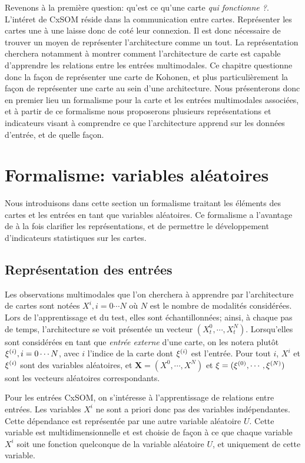Revenons à la première question: qu'est ce qu'une carte \emph{qui fonctionne ?}. L'intéret de CxSOM réside dans la communication entre cartes. Représenter les cartes une à une laisse donc de coté leur connexion. Il est donc nécessaire de trouver un moyen de représenter l'architecture comme un tout. La représentation cherchera notamment à montrer comment l'architecture de carte est capable d'apprendre les relations entre les entrées multimodales.
Ce chapitre questionne donc la façon de représenter une carte de Kohonen, et plus particulièrement la façon de représenter une carte au sein d'une architecture. Nous présenterons donc en premier lieu un formalisme pour la carte et les entrées multimodales associées, et à partir de ce formalisme nous proposerons plusieurs représentations et indicateurs visant à comprendre ce que l'architecture apprend sur les données d'entrée, et de quelle façon. 

\section{Formalisme: variables aléatoires}

Nous introduisons dans cette section un formalisme traitant les éléments des cartes et les entrées en tant que variables aléatoires. Ce formalisme a l'avantage de à la fois clarifier les représentations, et de permettre le développement d'indicateurs statistiques sur les cartes.

\subsection{Représentation des entrées}

Les observations multimodales que l'on cherchera à apprendre par l'architecture de cartes sont notées ${X^i, i = 0 \cdots N}$ où $N$ est le nombre de modalités considérées. Lors de l'apprentissage et du test, elles sont échantillonnées; ainsi, à chaque pas de temps, l'architecture se voit présentée un vecteur $(X^0_t, \cdots, X^N_t)$.
Lorsqu'elles sont considérées en tant que \emph{entrée externe} d'une carte, on les notera plutôt ${\xi^{({i})}, i=0 \cdots N} $, avec $i$ l'indice de la carte dont $\xi^{({i})}$ est l'entrée.
Pour tout $i$, $X^i$ et $\xi^{({i})}$ sont des variables aléatoires, et $\mathbf{X} = (X^0, \cdots, X^N)$ et $\mathbf{\xi} = (\xi^{({0})}, \cdots , \xi^{({N})})$ sont les vecteurs aléatoires correspondants.

Pour les entrées CxSOM, on s'intéresse à l'apprentissage de relations entre entrées. Les variables $X^i$ ne sont a priori donc pas des variables indépendantes. Cette dépendance est représentée par une autre variable aléatoire $U$. Cette variable est multidimensionnelle et est choisie de façon à ce que chaque variable $X^i$ soit une fonction quelconque de la variable aléatoire $U$, et uniquement de cette variable.

